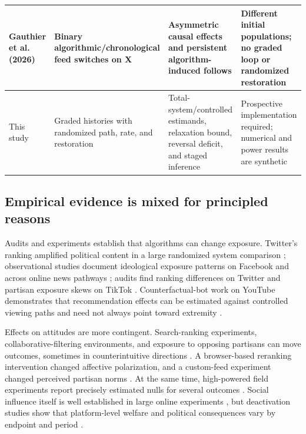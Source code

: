 \documentclass[10pt,a4paper]{article}
\begin{document}
\begin{table}[!htbp]
\begin{tabularx}{\textwidth}{|p{2.6cm}|Y|Y|Y|}
\hline
Gauthier et al. (2026) & Binary algorithmic/chronological feed switches on X & Asymmetric causal effects and persistent algorithm-induced follows & Different initial populations; no graded loop or randomized restoration\\
\hline
This study & Graded histories with randomized path, rate, and restoration & Total-system/controlled estimands, relaxation bound, reversal deficit, and staged inference & Prospective implementation required; numerical and power results are synthetic\\
\hline
\end{tabularx}
\end{table}

\subsection{Empirical evidence is mixed for principled reasons}

Audits and experiments establish that algorithms can change exposure. Twitter's ranking amplified political content in a large randomized system comparison \cite{huszar2022amplification}; observational studies document ideological exposure patterns on Facebook and across online news pathways \cite{bakshy2015exposure,flaxman2016bubbles}; audits find ranking differences on Twitter and partisan exposure skews on TikTok \cite{bandy2021twitter,ibrahim2026tiktok}. Counterfactual-bot work on YouTube demonstrates that recommendation effects can be estimated against controlled viewing paths and need not always point toward extremity \cite{hosseinmardi2024youtube}.

Effects on attitudes are more contingent. Search-ranking experiments, collaborative-filtering environments, and exposure to opposing partisans can move outcomes, sometimes in counterintuitive directions \cite{cho2020search,neumann2023curation,bail2018opposing}. A browser-based reranking intervention changed affective polarization, and a custom-feed experiment changed perceived partisan norms \cite{piccardi2025reranking,brady2026norms}. At the same time, high-powered field experiments report precisely estimated nulls for several outcomes \cite{guess2023feeds,nyhan2023likeminded,guess2023reshares}. Social influence itself is well established in large online experiments \cite{muchnik2013influence,bond2012mobilization}, but deactivation studies show that platform-level welfare and political consequences vary by endpoint and period \cite{allcott2024deactivation}.
\end{document}
